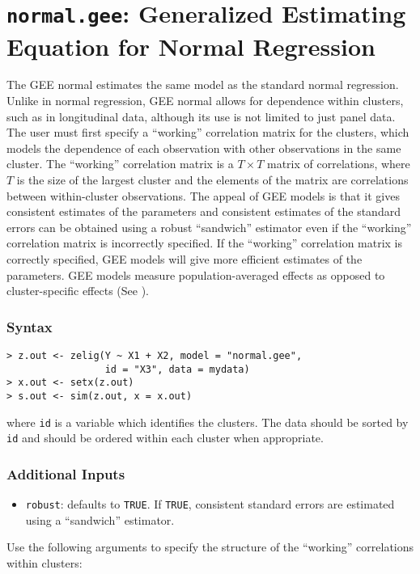 


\section{\texttt{normal.gee}: Generalized Estimating Equation for Normal Regression}
\label{normal.gee}

The GEE normal estimates the same model as the standard normal
regression.  Unlike in normal
regression, GEE normal allows for dependence within clusters, such as
in longitudinal data, although its use is not limited to just
panel data.  The user must first specify a ``working''
correlation matrix for the clusters, which models the dependence of each observation with other observations in the same cluster.  The ``working'' correlation matrix is a $T \times T$ matrix of correlations, where $T$ is the size of the largest cluster and the elements of the matrix are correlations between within-cluster observations.  The appeal of GEE models is that it gives consistent estimates of the parameters and consistent estimates of
the standard errors can be obtained using a robust ``sandwich''
estimator even if the ``working'' correlation matrix is incorrectly
specified.  If the ``working'' correlation matrix is correctly specified, GEE models will give more efficient estimates of the parameters.  GEE models measure  population-averaged effects as opposed to cluster-specific effects (See \citet{Zorn01}).     

\subsubsection{Syntax}

\begin{verbatim}
> z.out <- zelig(Y ~ X1 + X2, model = "normal.gee",
                 id = "X3", data = mydata)
> x.out <- setx(z.out)
> s.out <- sim(z.out, x = x.out)
\end{verbatim}

\noindent where \texttt{id} is a variable which identifies the clusters.  The data should be sorted by \texttt{id} and should be ordered within each cluster when appropriate.

\subsubsection{Additional Inputs}

\begin{itemize}
\item \texttt{robust}: defaults to \texttt{TRUE}.  If \texttt{TRUE}, consistent standard errors are estimated using a ``sandwich'' estimator.
\end{itemize}
Use the following arguments to specify the structure of the ``working'' correlations within clusters:


